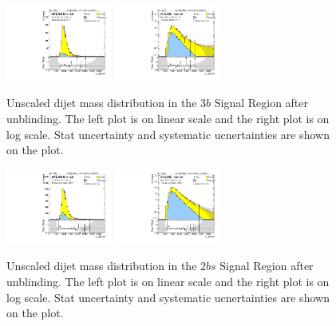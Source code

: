 \begin{figure}[htbp!]
\begin{center}
\includegraphics[width=0.31\textwidth,angle=-90]{figures/boosted/Signal_Syst/Moriond_bkg_9_ThreeTag_Signal_mHH_l.pdf}
\includegraphics[width=0.31\textwidth,angle=-90]{figures/boosted/Signal_Syst/Moriond_bkg_9_ThreeTag_Signal_mHH_l_1.pdf}  
  \caption{Unscaled dijet mass distribution in the $3b$ Signal Region after unblinding. The left plot is on linear scale and the right plot is on log scale. Stat uncertainty and systematic ucnertainties are shown on the plot.}
  \label{fig:boosted-3b-signal-l}
\end{center}
\end{figure}

\begin{figure}[htbp!]
\begin{center}
\includegraphics[width=0.31\textwidth,angle=-90]{figures/boosted/Signal_Syst/Moriond_bkg_9_TwoTag_split_Signal_mHH_l.pdf}
\includegraphics[width=0.31\textwidth,angle=-90]{figures/boosted/Signal_Syst/Moriond_bkg_9_TwoTag_split_Signal_mHH_l_1.pdf}  
  \caption{Unscaled dijet mass distribution in the $2bs$ Signal Region after unblinding. The left plot is on linear scale and the right plot is on log scale. Stat uncertainty and systematic ucnertainties are shown on the plot.}
  \label{fig:boosted-2b-signal-l}
\end{center}
\end{figure}

